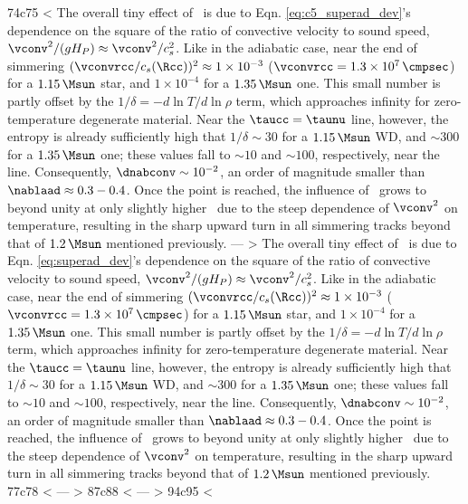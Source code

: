74c75
< The overall tiny effect of \dnabconv\ is due to Eqn. \ref{eq:c5_superad_dev}'s dependence on the square of the ratio of convective velocity to sound speed, $\vconv^2/(g H_P) \approx \vconv^2/c_s^2$.  Like in the adiabatic case, near the end of simmering $(\vconvrcc/c_s(\Rcc))^2 \approx 1\times10^{-3}$ ($\vconvrcc = 1.3\times10^7\,\cmpsec$) for a $1.15\,\Msun$ star, and $1\times10^{-4}$ for a $1.35\,\Msun$ one.  This small number is partly offset by the $1/\delta = -d\ln T/d\ln \rho$ term, which approaches infinity for zero-temperature degenerate material.  Near the $\taucc = \taunu$ line, however, the entropy is already sufficiently high that $1/\delta \sim 30$ for a $1.15\,\Msun$ WD, and $\sim 300$ for a $1.35\,\Msun$ one; these values fall to $\sim 10$ and $\sim 100$, respectively, near the \citeal{wooswk04} line.  Consequently, $\dnabconv \sim 10^{-2}$, an order of magnitude smaller than $\nablaad \approx 0.3 - 0.4$.  Once the \citeal{wooswk04} point is reached, the influence of \dnabconv\ grows to beyond unity at only slightly higher \Sc\ due to the steep dependence of $\vconv^2$ on temperature, resulting in the sharp upward turn in all simmering tracks beyond that of $1.2\,\Msun$ mentioned previously.
---
> The overall tiny effect of \dnabconv\ is due to Eqn. \ref{eq:superad_dev}'s dependence on the square of the ratio of convective velocity to sound speed, $\vconv^2/(g H_P) \approx \vconv^2/c_s^2$.  Like in the adiabatic case, near the end of simmering $(\vconvrcc/c_s(\Rcc))^2 \approx 1\times10^{-3}$ ($\vconvrcc = 1.3\times10^7\,\cmpsec$) for a $1.15\,\Msun$ star, and $1\times10^{-4}$ for a $1.35\,\Msun$ one.  This small number is partly offset by the $1/\delta = -d\ln T/d\ln \rho$ term, which approaches infinity for zero-temperature degenerate material.  Near the $\taucc = \taunu$ line, however, the entropy is already sufficiently high that $1/\delta \sim 30$ for a $1.15\,\Msun$ WD, and $\sim 300$ for a $1.35\,\Msun$ one; these values fall to $\sim 10$ and $\sim 100$, respectively, near the \citeal{wooswk04} line.  Consequently, $\dnabconv \sim 10^{-2}$, an order of magnitude smaller than $\nablaad \approx 0.3 - 0.4$.  Once the \citeal{wooswk04} point is reached, the influence of \dnabconv\ grows to beyond unity at only slightly higher \Sc\ due to the steep dependence of $\vconv^2$ on temperature, resulting in the sharp upward turn in all simmering tracks beyond that of $1.2\,\Msun$ mentioned previously.
77c78
< \label{ssec:c5_rotmag}
---
> \label{ssec:rotmag}
87c88
< \label{eq:c5_dnabrot_est_work}
---
> \label{eq:dnabrot_est_work}
94c95
< \label{eq:c5_dnabrot_est}
